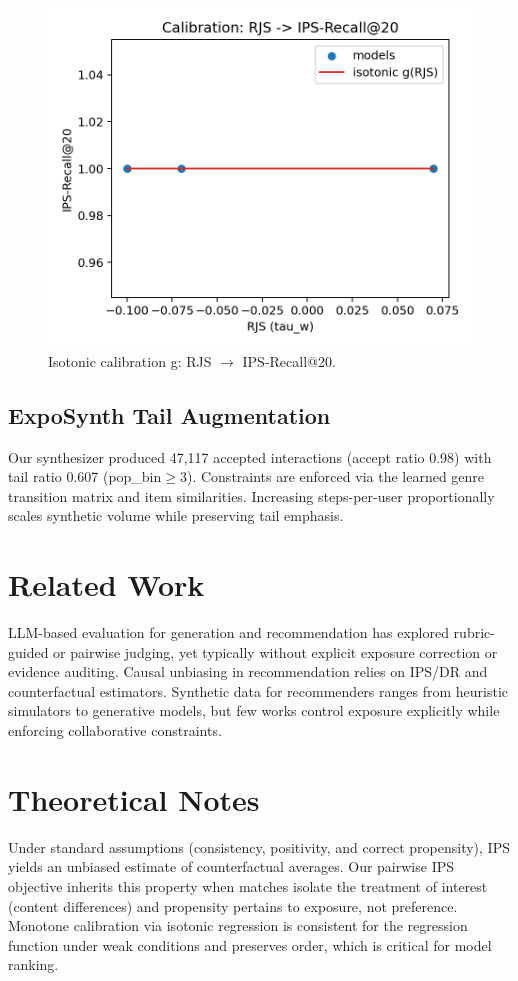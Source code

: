\documentclass[10pt]{article}
\begin{document}
\begin{figure}[h]
\centering
\includegraphics[width=0.7\linewidth]{../reports/figs/calib_isotonic.png}
\caption{Isotonic calibration g: RJS \(\to\) IPS-Recall@20.}
\label{fig:calib}
\end{figure}

\subsection{ExpoSynth Tail Augmentation}
Our synthesizer produced 47,117 accepted interactions (accept ratio 0.98) with tail ratio 0.607 (pop\_bin\(\ge\)3). Constraints are enforced via the learned genre transition matrix and item similarities. Increasing steps-per-user proportionally scales synthetic volume while preserving tail emphasis.

\section{Related Work}
LLM-based evaluation for generation and recommendation has explored rubric-guided or pairwise judging, yet typically without explicit exposure correction or evidence auditing. Causal unbiasing in recommendation relies on IPS/DR and counterfactual estimators. Synthetic data for recommenders ranges from heuristic simulators to generative models, but few works control exposure explicitly while enforcing collaborative constraints.

\section{Theoretical Notes}
Under standard assumptions (consistency, positivity, and correct propensity), IPS yields an unbiased estimate of counterfactual averages. Our pairwise IPS objective inherits this property when matches isolate the treatment of interest (content differences) and propensity pertains to exposure, not preference. Monotone calibration via isotonic regression is consistent for the regression function under weak conditions and preserves order, which is critical for model ranking.
\end{document}
